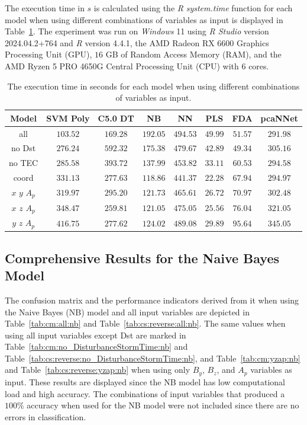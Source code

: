 \documentclass[sn-mathphys-num]{sn-jnl}%
\begin{document}
The execution time in $s$ is calculated using the \textit{R} \textit{system.time} function \cite{system.time2024} for each model when using different combinations of variables as input is displayed in Table~\ref{tab:time:total}. The experiment was run on \textit{Windows} 11 using \textit{R Studio} version 2024.04.2+764 and \textit{R} version 4.4.1, the AMD Radeon RX 6600 Graphics Processing Unit (GPU), $16$ GB of Random Access Memory (RAM), and the AMD Ryzen 5 PRO 4650G Central Processing Unit (CPU) with $6$ cores.

\begin{table}[!ht]
    \centering
    \caption{The execution time in seconds for each model when using different combinations of variables as input.}
	\label{tab:time:total}
	\begin{tabular}{|c|c|c|c|c|c|c|c|}
		\hline
		Model & SVM Poly & C5.0 DT & NB & NN & PLS & FDA & pcaNNet \\ \hline
		all & $103.52$ & $169.28$ & $192.05$ & $494.53$ & $49.99$ & $51.57$ & $291.98$ \\ \hline
		no Dst & $276.24$ & $592.32$ & $175.38$ & $479.67$ & $42.89$ & $49.34$ & $305.16$ \\ \hline
		no TEC & $285.58$ & $393.72$ & $137.99$ & $453.82$ & $33.11$ & $60.53$ & $294.58$ \\ \hline
		coord & $331.13$ & $277.63$ & $118.86$ & $441.37$ & $22.28$ & $67.94$ & $294.97$ \\ \hline
		$x$ $y$ $A_{p}$ & $319.97$ & $295.20$ & $121.73$ & $465.61$ & $26.72$ & $70.97$ & $302.48$ \\ \hline
		$x$ $z$ $A_{p}$ & $348.47$ & $259.81$ & $121.05$ & $475.05$ & $25.56$ & $76.04$ & $321.05$ \\ \hline
		$y$ $z$ $A_{p}$ & $416.75$ & $277.62$ & $124.02$ & $489.08$ & $29.89$ & $95.64$ & $345.05$ \\ \hline
	\end{tabular}
\end{table}

\subsection{Comprehensive Results for the Naive Bayes Model}

The confusion matrix and the performance indicators derived from it when using the Naive Bayes (NB) model and all input variables are depicted in Table~\ref{tab:cm:all:nb} and Table~\ref{tab:cs:reverse:all:nb}. The same values when using all input variables except Dst are marked in Table~\ref{tab:cm:no_DisturbanceStormTime:nb} and Table~\ref{tab:cs:reverse:no_DisturbanceStormTime:nb}, and Table~\ref{tab:cm:yzap:nb} and Table~\ref{tab:cs:reverse:yzap:nb} when using only $B_{y}$, $B_{z}$, and $A_{p}$ variables as input. These results are displayed since the NB model has low computational load and high accuracy. The combinations of input variables that produced a $100\%$ accuracy when used for the NB model were not included since there are no errors in classification.
\end{document}
